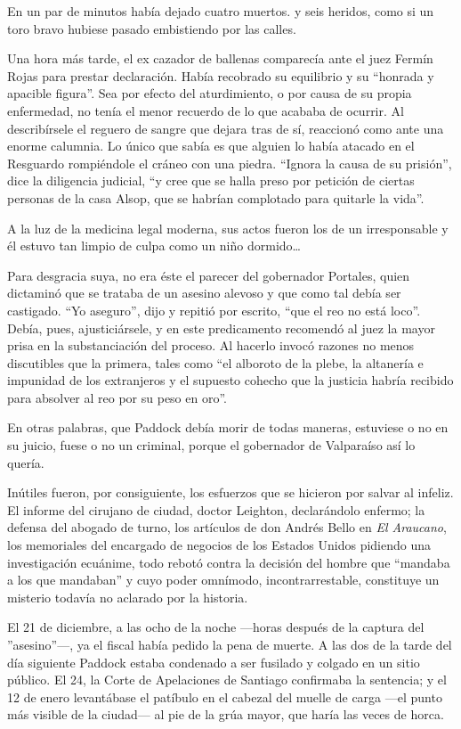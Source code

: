 \documentclass[10pt,twoside,openright]{memoir}
\begin{document}
En un par de minutos había dejado cuatro muertos. y seis heridos, como
si un toro bravo hubiese pasado embistiendo por las calles.

Una hora más tarde, el ex cazador de ballenas comparecía ante el juez Fermín
Rojas para prestar declaración. Había recobrado su equilibrio y su
``honrada y apacible figura''. Sea por efecto del aturdimiento, o por
causa de su propia enfermedad, no tenía el menor recuerdo de lo que
acababa de ocurrir. Al describírsele el reguero de sangre que dejara
tras de sí, reaccionó como ante una enorme calumnia. Lo
único que sabía es que alguien lo
había atacado en el Resguardo rompiéndole el cráneo con una piedra.
``Ignora la causa de su prisión'', dice la diligencia judicial, ``y cree
que se halla preso por petición de ciertas personas de la casa Alsop,
que se habrían complotado para quitarle la vida''.

A la luz de la medicina legal moderna, sus actos fueron los de un
irresponsable y él estuvo tan limpio de culpa como un niño
dormido\ldots

Para desgracia suya, no era éste el parecer del gobernador Portales,
quien dictaminó que se trataba de un asesino alevoso y que como tal
debía ser castigado. ``Yo aseguro'', dijo y repitió por escrito, ``que el
reo no está loco''. Debía, pues, ajusticiársele, y en este predicamento
recomendó al juez la mayor prisa en la substanciación del proceso. Al
hacerlo invocó razones no menos
discutibles que la primera, tales como ``el alboroto de la plebe, la
altanería e impunidad de los extranjeros y el supuesto cohecho que la
justicia habría recibido para absolver al reo por su peso en oro''.

En otras palabras, que Paddock debía morir de todas maneras, estuviese o
no en su juicio, fuese o no un criminal, porque el gobernador de
Valparaíso así lo quería.

Inútiles fueron, por consiguiente, los esfuerzos que se hicieron por
salvar al infeliz. El informe del cirujano de ciudad, doctor Leighton,
declarándolo enfermo; la defensa del abogado de turno, los artículos de
don Andrés Bello en \emph{El Araucano}, los memoriales del encargado de
negocios de los Estados Unidos pidiendo una investigación ecuánime, todo
rebotó contra la decisión del hombre que ``mandaba
a los que mandaban'' y cuyo poder
omnímodo, incontrarrestable, constituye un misterio todavía no aclarado
por la historia.

El 21 de diciembre, a las ocho de la noche ---horas después de la
captura del ''asesino''---, ya el fiscal había pedido la pena de muerte.
A las dos de la tarde del día siguiente Paddock estaba condenado a ser
fusilado y colgado en un sitio público. El 24, la
Corte de Apelaciones de Santiago
confirmaba la sentencia; y el 12 de enero levantábase el patíbulo en el
cabezal del muelle de carga ---el punto más visible de la ciudad--- al
pie de la grúa mayor, que haría las veces de horca.
\end{document}

